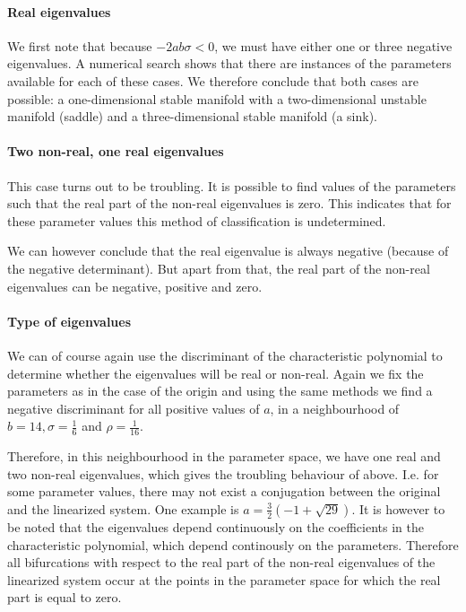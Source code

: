 \paragraph{Real eigenvalues}

We first note that because $-2ab\sigma < 0$, we must have either one
or three negative eigenvalues.  A numerical search shows that there
are instances of the parameters available for each of these cases.  We
therefore conclude that both cases are possible: a one-dimensional
stable manifold with a two-dimensional unstable manifold (saddle) and
a three-dimensional stable manifold (a sink).

\paragraph{Two non-real, one real eigenvalues}

This case turns out to be troubling.  It is possible to find values of
the parameters such that the real part of the non-real eigenvalues is
zero.  This indicates that for these parameter values this method of
classification is undetermined.

We can however conclude that the real eigenvalue is always negative
(because of the negative determinant).  But apart from that, the real
part of the non-real eigenvalues can be negative, positive and zero.

\paragraph{Type of eigenvalues}

We can of course again use the discriminant of the characteristic
polynomial to determine whether the eigenvalues will be real or
non-real.  Again we fix the parameters as in the case of the origin
and using the same methods we find a negative discriminant for all
positive values of $a$, in a neighbourhood of $b = 14, \sigma =
\frac{1}{6}$ and $\rho = \frac{1}{16}$.

Therefore, in this neighbourhood in the parameter space, we have one
real and two non-real eigenvalues, which gives the troubling behaviour
of above.  I.e. for some parameter values, there may not exist a
conjugation between the original and the linearized system.  One
example is $a = \frac{3}{2}(-1 + \sqrt{29})$.  It is however to be
noted that the eigenvalues depend continuously on the coefficients in
the characteristic polynomial, which depend continously on the
parameters.  Therefore all bifurcations with respect to the real part
of the non-real eigenvalues of the linearized system occur at the
points in the parameter space for which the real part is equal to zero.



